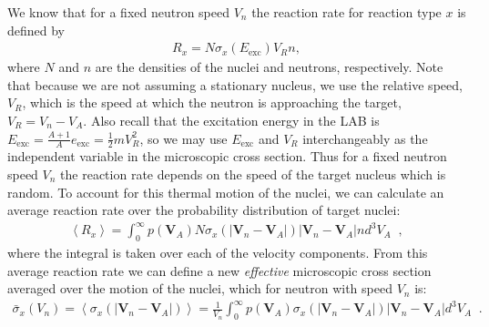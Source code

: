 \documentclass[11pt]{article}
\renewcommand\vec{\mathbf}
\begin{document}
We know that for a fixed neutron speed \(V_n\) the reaction rate for reaction type \(x\) is defined by
\begin{align}
  R_x = N \sigma_x(E_\text{exc}) V_R n,
\end{align}
where \(N\) and \(n\) are the densities of the nuclei and neutrons, respectively.  Note that because we are not assuming a stationary nucleus, we use the relative speed, \(V_R\), which is the speed at which the neutron is approaching the target, \(V_R = V_n - V_A\).  Also recall that the excitation energy  in the LAB is \(E_\text{exc} = \frac{A+1}{A}e_\text{exc} = \frac{1}{2}mV_R^2\), so we may use \(E_\text{exc}\) and \(V_R\) interchangeably as the independent variable in the microscopic cross section.  Thus for a fixed neutron speed \(V_n\) the reaction rate depends on the speed of the target nucleus which is random.  To account for this thermal motion of the nuclei, we can calculate an average reaction rate over the probability distribution of target nuclei:
\begin{align}
  \left<R_x\right> = \int_0^\infty p(\vec{V}_A) N \sigma_x(\left| \vec{V}_n - \vec{V}_A \right|) \left| \vec{V}_n - \vec{V}_A \right| n d^3V_A \;\;,
\end{align}
where the integral is taken over each of the velocity components.  From this average reaction rate we can define a new \emph{effective} microscopic cross section averaged over the motion of the nuclei, which for neutron with speed \(V_n\) is:
\begin{align}
  \bar{\sigma}_x(V_n) = 
  \left<\sigma_x(\left| \vec{V}_n - \vec{V}_A \right|)\right> = 
  \frac{1}{V_n} \int_0^\infty p(\vec{V}_A) \sigma_x(\left| \vec{V}_n - \vec{V}_A \right|) \left| \vec{V}_n - \vec{V}_A \right| d^3V_A \;\;.
\end{align}
\end{document}
